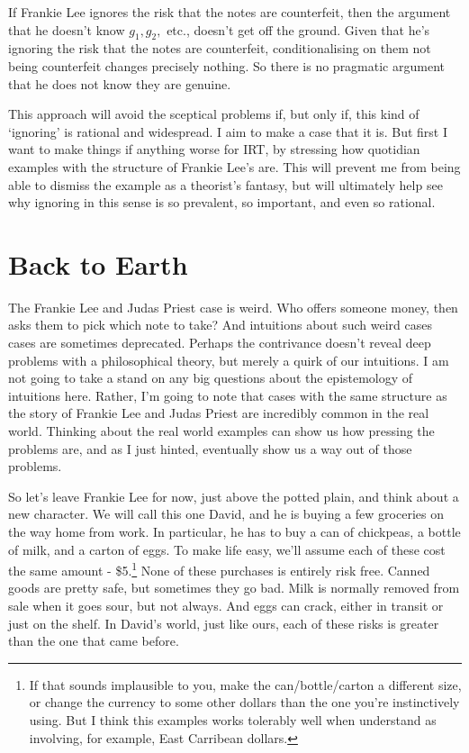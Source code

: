\documentclass[11pt,]{book}
\let\rmarkdownfootnote\footnote%
\def\footnote{\protect\rmarkdownfootnote}
\begin{document}
If Frankie Lee ignores the risk that the notes are counterfeit, then the argument that he doesn't know \(g_1, g_2,\) etc., doesn't get off the ground. Given that he's ignoring the risk that the notes are counterfeit, conditionalising on them not being counterfeit changes precisely nothing. So there is no pragmatic argument that he does not know they are genuine.

This approach will avoid the sceptical problems if, but only if, this kind of `ignoring' is rational and widespread. I aim to make a case that it is. But first I want to make things if anything worse for IRT, by stressing how quotidian examples with the structure of Frankie Lee's are. This will prevent me from being able to dismiss the example as a theorist's fantasy, but will ultimately help see why ignoring in this sense is so prevalent, so important, and even so rational.

\hypertarget{backearth}{%
\section{Back to Earth}\label{backearth}}

The Frankie Lee and Judas Priest case is weird. Who offers someone money, then asks them to pick which note to take? And intuitions about such weird cases cases are sometimes deprecated. Perhaps the contrivance doesn't reveal deep problems with a philosophical theory, but merely a quirk of our intuitions. I am not going to take a stand on any big questions about the epistemology of intuitions here. Rather, I'm going to note that cases with the same structure as the story of Frankie Lee and Judas Priest are incredibly common in the real world. Thinking about the real world examples can show us how pressing the problems are, and as I just hinted, eventually show us a way out of those problems.

So let's leave Frankie Lee for now, just above the potted plain, and think about a new character. We will call this one David, and he is buying a few groceries on the way home from work. In particular, he has to buy a can of chickpeas, a bottle of milk, and a carton of eggs. To make life easy, we'll assume each of these cost the same amount - \$5.\footnote{If that sounds implausible to you, make the can/bottle/carton a different size, or change the currency to some other dollars than the one you're instinctively using. But I think this examples works tolerably well when understand as involving, for example, East Carribean dollars.} None of these purchases is entirely risk free. Canned goods are pretty safe, but sometimes they go bad. Milk is normally removed from sale when it goes sour, but not always. And eggs can crack, either in transit or just on the shelf. In David's world, just like ours, each of these risks is greater than the one that came before.
\end{document}
